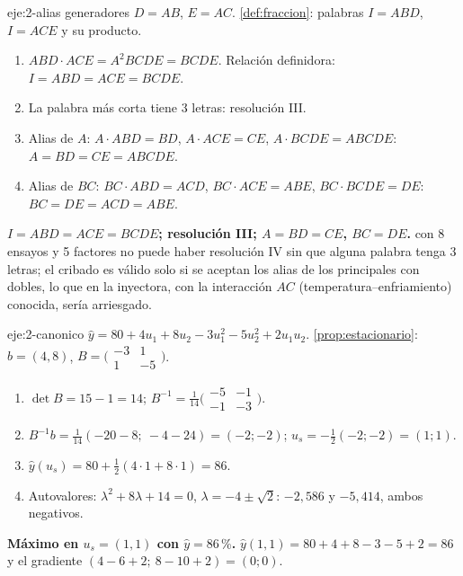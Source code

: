 \begin{solucion}{eje:2-alias}
\datos generadores $D=AB$, $E=AC$.
\planteamiento \cref{def:fraccion}: palabras $I=ABD$, $I=ACE$ y su producto.
\pasos
\begin{enumerate}[label=\arabic*.]
  \item $ABD\cdot ACE=A^2BCDE=BCDE$. Relación definidora: $I=ABD=ACE=BCDE$.
  \item La palabra más corta tiene 3 letras: resolución III.
  \item Alias de $A$: $A\cdot ABD=BD$, $A\cdot ACE=CE$, $A\cdot BCDE=ABCDE$: $A=BD=CE=ABCDE$.
  \item Alias de $BC$: $BC\cdot ABD=ACD$, $BC\cdot ACE=ABE$, $BC\cdot BCDE=DE$: $BC=DE=ACD=ABE$.
\end{enumerate}
\resultado \textbf{$I=ABD=ACE=BCDE$; resolución III; $A=BD=CE$, $BC=DE$.}
\comprobacion con 8 ensayos y 5 factores no puede haber resolución IV sin que alguna palabra tenga 3 letras; el cribado es válido solo si se aceptan los alias de los principales con dobles, lo que en la inyectora, con la interacción $AC$ (temperatura--enfriamiento) conocida, sería arriesgado.
\end{solucion}

\begin{solucion}{eje:2-canonico}
\datos $\hat y=80+4u_1+8u_2-3u_1^2-5u_2^2+2u_1u_2$.
\planteamiento \cref{prop:estacionario}: $b=(4,8)$, $B=\bigl(\begin{smallmatrix}-3&1\\1&-5\end{smallmatrix}\bigr)$.
\pasos
\begin{enumerate}[label=\arabic*.]
  \item $\det B=15-1=14$; $B^{-1}=\frac1{14}\bigl(\begin{smallmatrix}-5&-1\\-1&-3\end{smallmatrix}\bigr)$.
  \item $B^{-1}b=\frac1{14}(-20-8;\ -4-24)=(-2;-2)$; $u_s=-\frac12(-2;-2)=(1;1)$.
  \item $\hat y(u_s)=80+\frac12(4\cdot1+8\cdot1)=86$.
  \item Autovalores: $\lambda^2+8\lambda+14=0$, $\lambda=-4\pm\sqrt2$: $-2{,}586$ y $-5{,}414$, ambos negativos.
\end{enumerate}
\resultado \textbf{Máximo en $u_s=(1,1)$ con $\hat y=86\,\%$.}
\comprobacion $\hat y(1,1)=80+4+8-3-5+2=86$ y el gradiente $(4-6+2;\ 8-10+2)=(0;0)$.
\end{solucion}

